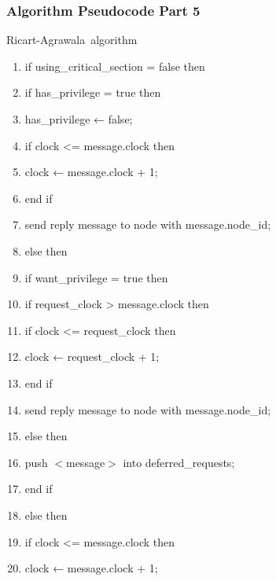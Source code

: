 \documentclass[11pt]{beamer}              %
\begin{document}
\begin{frame}
\frametitle{Algorithm Pseudocode Part 5}

\begin{center}
\begin{algorithm}[H]
	\scriptsize
	\def\algorithmlabel{Ricart-Agrawala}
    \caption{\algorithmlabel\ algorithm}
    \label{alg:ricart_agrawala}
    \begin{algorithmic}[1]
            \begin{enumerate}
                \item if using\_critical\_section = false then
                \item \quad if has\_privilege = true then
                \item \quad \quad has\_privilege ← false;
                \item \quad \quad if clock <= message.clock then
                \item \quad \quad \quad clock ← message.clock + 1;
                \item \quad \quad end if
                \item \quad \quad send reply message to node with message.node\_id;
                \item \quad else then
                \item \quad \quad if want\_privilege = true then
                \item \quad \quad \quad if request\_clock > message.clock then
                \item \quad \quad \quad \quad if clock <= request\_clock then
                \item \quad \quad \quad \quad \quad clock ← request\_clock + 1;
                \item \quad \quad \quad \quad end if
                \item \quad \quad \quad send reply message to node with message.node\_id;
                \item \quad \quad \quad else then
                \item \quad \quad \quad \quad push $<$message$>$ into deferred\_requests;
                \item \quad \quad \quad end if
                \item \quad \quad else then
                \item \quad \quad \quad if clock <= message.clock then
                \item \quad \quad \quad \quad clock ← message.clock + 1;

\end{enumerate}
\end{algorithmic}
\end{algorithm}
\end{center}
\end{frame}
\end{document}
